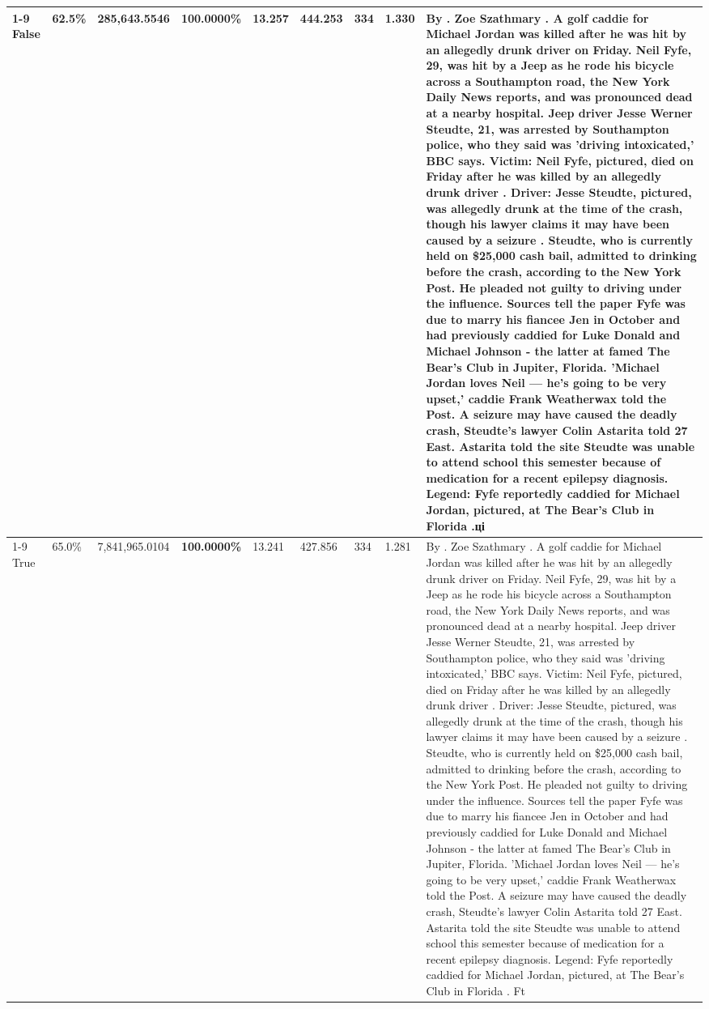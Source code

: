 \begin{table}[H]
\begin{tabular}{lllrlllll}
\cline{1-9}
False & 62.5\% & \color{red} 285,643.5546 & \bfseries \color{red} 100.0000\% & 13.257 & 444.253 & 334 & 1.330 & By . Zoe Szathmary . A golf caddie for Michael Jordan was killed after he was hit by an allegedly drunk driver on Friday. Neil Fyfe, 29, was hit by a Jeep as he rode his bicycle across a Southampton road, the New York Daily News reports, and was pronounced dead at a nearby hospital. Jeep driver Jesse Werner Steudte, 21, was arrested by Southampton police, who they said was 'driving intoxicated,' BBC says. Victim: Neil Fyfe, pictured, died on Friday after he was killed by an allegedly drunk driver . Driver: Jesse Steudte, pictured, was allegedly drunk at the time of the crash, though his lawyer claims it may have been caused by a seizure . Steudte, who is currently held on \$25,000 cash bail, admitted to drinking before the crash, according to the New York Post. He pleaded not guilty to driving under the influence. Sources tell the paper Fyfe was due to marry his fiancee Jen in October and had previously caddied for Luke Donald and Michael Johnson - the latter at famed The Bear's Club in Jupiter, Florida. 'Michael Jordan loves Neil — he’s going to be very upset,' caddie Frank Weatherwax told the Post. A seizure may have caused the deadly crash, Steudte's lawyer Colin Astarita told 27 East. Astarita told the site Steudte was unable to attend school this semester because of medication for a recent epilepsy diagnosis. Legend: Fyfe reportedly caddied for Michael Jordan, pictured, at The Bear's Club in Florida .ці \\
\cline{1-9}
True & 65.0\% & 7,841,965.0104 & \bfseries \color{red} 100.0000\% & 13.241 & 427.856 & 334 & 1.281 & By . Zoe Szathmary . A golf caddie for Michael Jordan was killed after he was hit by an allegedly drunk driver on Friday. Neil Fyfe, 29, was hit by a Jeep as he rode his bicycle across a Southampton road, the New York Daily News reports, and was pronounced dead at a nearby hospital. Jeep driver Jesse Werner Steudte, 21, was arrested by Southampton police, who they said was 'driving intoxicated,' BBC says. Victim: Neil Fyfe, pictured, died on Friday after he was killed by an allegedly drunk driver . Driver: Jesse Steudte, pictured, was allegedly drunk at the time of the crash, though his lawyer claims it may have been caused by a seizure . Steudte, who is currently held on \$25,000 cash bail, admitted to drinking before the crash, according to the New York Post. He pleaded not guilty to driving under the influence. Sources tell the paper Fyfe was due to marry his fiancee Jen in October and had previously caddied for Luke Donald and Michael Johnson - the latter at famed The Bear's Club in Jupiter, Florida. 'Michael Jordan loves Neil — he’s going to be very upset,' caddie Frank Weatherwax told the Post. A seizure may have caused the deadly crash, Steudte's lawyer Colin Astarita told 27 East. Astarita told the site Steudte was unable to attend school this semester because of medication for a recent epilepsy diagnosis. Legend: Fyfe reportedly caddied for Michael Jordan, pictured, at The Bear's Club in Florida . Ft \\

\end{tabular}
\end{table}
